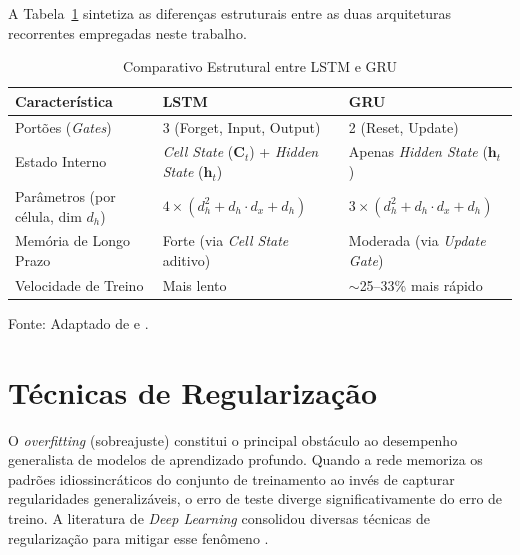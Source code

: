 A Tabela~\ref{tab:lstm_vs_gru} sintetiza as diferenças estruturais entre as duas arquiteturas recorrentes empregadas neste trabalho.

\begin{table}[H]
\caption{Comparativo Estrutural entre LSTM e GRU}
\label{tab:lstm_vs_gru}
\begin{center}
\small
\begin{tabular}{p{4cm} p{5cm} p{5cm}}
\toprule
\textbf{Característica} & \textbf{LSTM} & \textbf{GRU} \\
\midrule
Portões (\textit{Gates}) & 3 (Forget, Input, Output) & 2 (Reset, Update) \\
Estado Interno & \textit{Cell State} ($\mathbf{C}_t$) + \textit{Hidden State} ($\mathbf{h}_t$) & Apenas \textit{Hidden State} ($\mathbf{h}_t$) \\
Parâmetros (por célula, dim $d_h$) & $4 \times (d_h^2 + d_h \cdot d_x + d_h)$ & $3 \times (d_h^2 + d_h \cdot d_x + d_h)$ \\
Memória de Longo Prazo & Forte (via \textit{Cell State} aditivo) & Moderada (via \textit{Update Gate}) \\
Velocidade de Treino & Mais lento & $\sim$25--33\% mais rápido \\
\bottomrule
\end{tabular}
\normalsize
\end{center}
\small{Fonte: Adaptado de \cite{cho2014learning} e \cite{hochreiter1997long}.}
\end{table}

\section{Técnicas de Regularização}\label{sec:regularizacao}

O \textit{overfitting} (sobreajuste) constitui o principal obstáculo ao desempenho generalista de modelos de aprendizado profundo. Quando a rede memoriza os padrões idiossincráticos do conjunto de treinamento ao invés de capturar regularidades generalizáveis, o erro de teste diverge significativamente do erro de treino. A literatura de \textit{Deep Learning} consolidou diversas técnicas de regularização para mitigar esse fenômeno \cite{goodfellow2016deep, srivastava2014dropout}.


